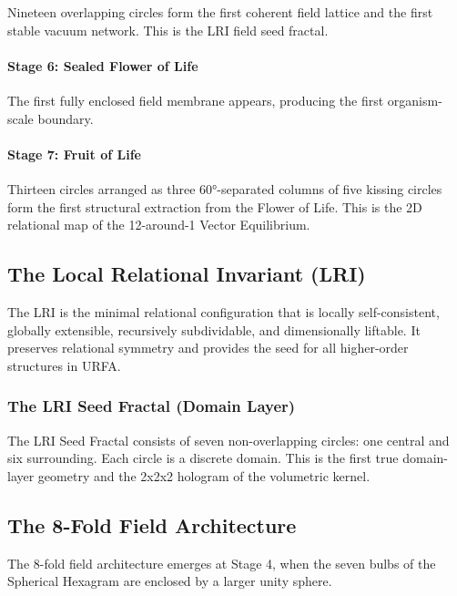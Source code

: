 Nineteen overlapping circles form the first coherent field lattice and the first stable vacuum network.  
This is the LRI field seed fractal.

\paragraph{Stage 6: Sealed Flower of Life}

The first fully enclosed field membrane appears, producing the first organism-scale boundary.

\paragraph{Stage 7: Fruit of Life}

Thirteen circles arranged as three 60°-separated columns of five kissing circles form the first structural extraction from the Flower of Life.  
This is the 2D relational map of the 12-around-1 Vector Equilibrium.

\subsection{The Local Relational Invariant (LRI)}

The LRI is the minimal relational configuration that is locally self-consistent, globally extensible, recursively subdividable, and dimensionally liftable.  
It preserves relational symmetry and provides the seed for all higher-order structures in URFA.

\subsubsection{The LRI Seed Fractal (Domain Layer)}

The LRI Seed Fractal consists of seven non-overlapping circles: one central and six surrounding.  
Each circle is a discrete domain.  
This is the first true domain-layer geometry and the 2x2x2 hologram of the volumetric kernel.

\subsection{The 8-Fold Field Architecture}

The 8-fold field architecture emerges at Stage 4, when the seven bulbs of the Spherical Hexagram are enclosed by a larger unity sphere.

